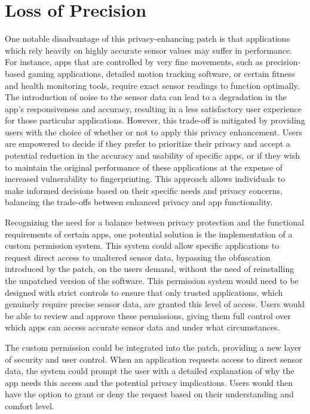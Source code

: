 \documentclass[11pt,
  oneside,openany,    %
]{scrreprt}
\begin{document}
\section{Loss of Precision}
\label{sec:loss_of_precision}
One notable disadvantage of this privacy-enhancing patch is that applications which rely heavily on highly accurate sensor values may suffer in performance. For instance, apps that are controlled by very fine movements, such as precision-based gaming applications, detailed motion tracking software, or certain fitness and health monitoring tools, require exact sensor readings to function optimally. 
The introduction of noise to the sensor data can lead to a degradation in the app's responsiveness and accuracy, resulting in a less satisfactory user experience for those particular applications. However, this trade-off is mitigated by providing users with the choice of whether or not to apply this privacy enhancement.
Users are empowered to decide if they prefer to prioritize their privacy and accept a potential reduction in the accuracy and usability of specific apps, or if they wish to maintain the original performance of these applications at the expense of increased vulnerability to fingerprinting.
This approach allows individuals to make informed decisions based on their specific needs and privacy concerns, balancing the trade-offs between enhanced privacy and app functionality.

Recognizing the need for a balance between privacy protection and the functional requirements of certain apps, one potential solution is the implementation of a custom permission system. 
This system could allow specific applications to request direct access to unaltered sensor data, bypassing the obfuscation introduced by the patch, on the users demand, without the need of reinstalling the unpatched version of the software.
This permission system would need to be designed with strict controls to ensure that only trusted applications, which genuinely require precise sensor data, are granted this level of access. 
Users would be able to review and approve these permissions, giving them full control over which apps can access accurate sensor data and under what circumstances.

The custom permission could be integrated into the patch, providing a new layer of security and user control. 
When an application requests access to direct sensor data, the system could prompt the user with a detailed explanation of why the app needs this access and the potential privacy implications. 
Users would then have the option to grant or deny the request based on their understanding and comfort level.
\end{document}
